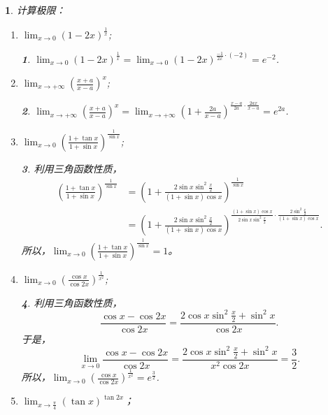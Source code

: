 \documentclass[utf8]{book}
\newtheorem{example}{}[section]             %
\newtheorem{solution}{}
\begin{document}
\begin{example}
计算极限：
\renewcommand\labelenumi{\normalfont(\theenumi)}
\begin{enumerate}
\item $\displaystyle\lim_{x\to 0}(1-2x)^{\frac{1}{x}}$;
\begin{solution}
$\displaystyle\lim_{x\to 0}(1-2x)^{\frac{1}{x}}=\displaystyle\lim_{x\to 0}(1-2x)^{\frac{-1}{2x}\cdot(-2)}=e^{-2}$.
\end{solution}
\item $\displaystyle\lim_{x\to +\infty}\left(\frac{x+a}{x-a}\right)^x$;
\begin{solution}
$\displaystyle\lim_{x\to +\infty}\left(\frac{x+a}{x-a}\right)^x=\displaystyle\lim_{x\to +\infty}\left(1+\frac{2a}{x-a}\right)^{\frac{x-a}{2a}\cdot\frac{2ax}{x-a}}=e^{2a}$.
\end{solution}
\item $\displaystyle\lim_{x\to 0}\left(\frac{1+\tan{x}}{1+\sin{x}}\right)^{\frac{1}{\sin{x}}}$;
\begin{solution}利用三角函数性质，
\begin{equation*}
\begin{split}
\left(\frac{1+\tan{x}}{1+\sin{x}}\right)^{\frac{1}{\sin{x}}}&=\left(1+\frac{2\sin{x}\sin^2{\frac{x}{2}}}{(1+\sin{x})\cos{x}}\right)^{\frac{1}{\sin{x}}}\\&=
\left(1+\frac{2\sin{x}\sin^2{\frac{x}{2}}}{(1+\sin{x})\cos{x}}\right)^{\displaystyle\frac{(1+\sin{x})\cos{x}}{2\sin{x}\sin^2{\frac{x}{2}}}\cdot\frac{2\sin^2{\frac{x}{2}}}{(1+\sin{x})\cos{x}}}.
\end{split}
\end{equation*}
所以，$\displaystyle\lim_{x\to 0}\left(\frac{1+\tan{x}}{1+\sin{x}}\right)^{\frac{1}{\sin{x}}}=1$。
\end{solution}
\item $\displaystyle\lim_{x\to 0}\left(\frac{\cos{x}}{\cos{2x}}\right)^{\frac{1}{x^2}}$;
\begin{solution}利用三角函数性质，
$$\displaystyle\frac{\cos{x}-\cos{2x}}{\cos{2x}}=\displaystyle\frac{2\cos{x}\sin^2{\frac{x}{2}}+\sin^2{x}}{\cos{2x}}.$$
于是，
$$\displaystyle\lim_{x\to 0}\displaystyle\frac{\cos{x}-\cos{2x}}{\cos{2x}}=\displaystyle\frac{2\cos{x}\sin^2{\frac{x}{2}}+\sin^2{x}}{x^2\cos{2x}}=\frac{3}{2}.$$
所以，$\displaystyle\lim_{x\to 0}\left(\frac{\cos{x}}{\cos{2x}}\right)^{\frac{1}{x^2}}=e^{\frac{3}{2}}$.
\end{solution}
\item  $\displaystyle\lim_{x\to \frac{\pi}{4}}\left(\tan{x}\right)^{\tan{2x}}$；

\end{enumerate}
\end{example}
\end{document}

